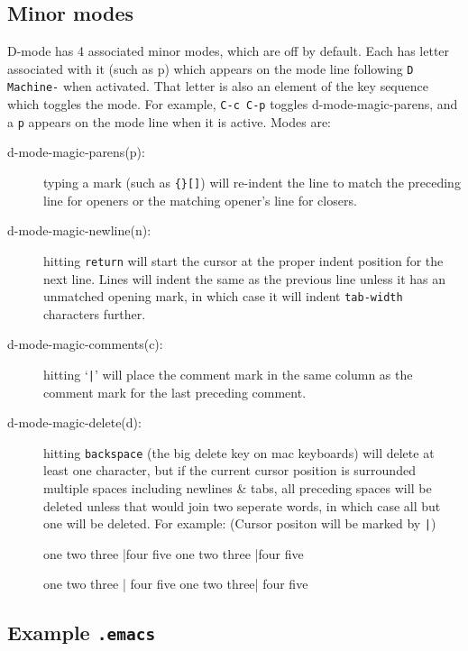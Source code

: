 \documentclass[12pt]{article}
\begin{document}
\subsection{Minor modes}
  
D-mode has 4 associated minor modes, which are off by default. Each
has letter associated with it (such as p) which appears on the mode
line following \verb$D Machine-$ when activated.  That letter is also
an element of the key sequence which toggles the mode.  For example,
\verb$C-c C-p$ toggles d-mode-magic-parens, and a \verb$p$ appears on
the mode line when it is active.  Modes are:
\begin{description} 
  \item [d-mode-magic-parens(p):] typing a mark (such as \verb${}[]$)
  will re-indent the line to match the preceding line for openers or
  the matching opener's line for closers.
      
  \item [d-mode-magic-newline(n):] hitting \verb$return$ will start
  the cursor at the proper indent position for the next line. Lines
  will indent the same as the previous line unless it has an unmatched
  opening mark, in which case it will indent \verb$tab-width$
  characters further.
  
  \item [d-mode-magic-comments(c):] hitting `\verb$|$' will place the
  comment mark in the same column as the comment mark for the last
  preceding comment.
      
  \item [d-mode-magic-delete(d):] hitting \verb$backspace$ (the big
  delete key on mac keyboards) will delete at least one character, but
  if the current cursor position is surrounded multiple spaces
  including newlines \& tabs, all preceding spaces will be deleted
  unless that would join two seperate words, in which case all but one
  will be deleted. For example: (Cursor positon will be marked by
  \verb$|$)

\begin{verbatim*}
one two three     |four five
one two three |four five

one two three  |  four five
one two three|  four five   
\end{verbatim*}
\end{description}

\subsection{Example \tt.emacs}
  
\end{document}
